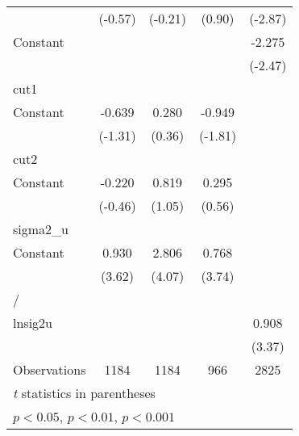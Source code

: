 {\begin{longtable}{l*{4}{c}}
                &  (-0.57)         &  (-0.21)         &   (0.90)         &  (-2.87)         \\
[1em]
Constant        &                  &                  &                  &   -2.275\sym{*}  \\
                &                  &                  &                  &  (-2.47)         \\
\hline
cut1            &                  &                  &                  &                  \\
Constant        &   -0.639         &    0.280         &   -0.949         &                  \\
                &  (-1.31)         &   (0.36)         &  (-1.81)         &                  \\
\hline
cut2            &                  &                  &                  &                  \\
Constant        &   -0.220         &    0.819         &    0.295         &                  \\
                &  (-0.46)         &   (1.05)         &   (0.56)         &                  \\
\hline
sigma2\_u        &                  &                  &                  &                  \\
Constant        &    0.930\sym{***}&    2.806\sym{***}&    0.768\sym{***}&                  \\
                &   (3.62)         &   (4.07)         &   (3.74)         &                  \\
\hline
/               &                  &                  &                  &                  \\
lnsig2u         &                  &                  &                  &    0.908\sym{***}\\
                &                  &                  &                  &   (3.37)         \\
\hline
Observations    &     1184         &     1184         &      966         &     2825         \\
\hline\hline
\multicolumn{5}{l}{\footnotesize \textit{t} statistics in parentheses}\\
\multicolumn{5}{l}{\footnotesize \sym{*} \(p<0.05\), \sym{**} \(p<0.01\), \sym{***} \(p<0.001\)}\\
\end{longtable}
}
